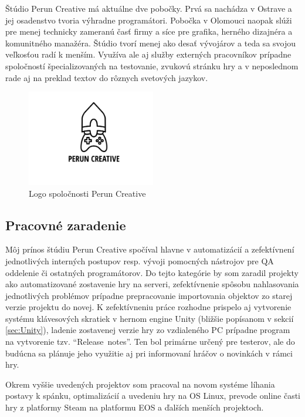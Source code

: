 \documentclass[slovak,bachelorpractice,dept460,male,csharp,cpdeclaration]{diploma}
\begin{document}
Štúdio Perun Creative má aktuálne dve pobočky. Prvá sa nachádza v Ostrave a jej osadenstvo tvoria výhradne programátori. Pobočka v Olomouci naopak slúži pre menej technicky zameranú časť firmy a síce pre grafika, herného dizajnéra a komunitného manažéra. Štúdio tvorí menej ako desať vývojárov a teda sa svojou veľkosťou radí k menším. Využíva ale aj služby externých pracovníkov prípadne spoločností špecializovaných na testovanie, zvukovú stránku hry a v neposlednom rade aj na preklad textov do rôznych svetových jazykov.
\vspace{-20pt}
\begin{figure}[!htbp]
	\centering
	\includegraphics[width=0.5\textwidth]{Pictures/perunLogo.pdf}
	\vspace{-35pt}
	\caption{Logo spoločnosti Perun Creative}
	\label{pic:perunLogo}
\end{figure}
\vspace{-20pt}
\subsection{Pracovné zaradenie}
\label{sec:Me}
Môj prínos štúdiu Perun Creative spočíval hlavne v automatizácií a zefektívnení jednotlivých interných postupov resp. vývoji pomocných nástrojov pre QA oddelenie či ostatných programátorov. Do tejto kategórie by som zaradil projekty ako automatizované zostavenie hry na serveri, zefektívnenie spôsobu nahlasovania jednotlivých problémov prípadne prepracovanie importovania objektov zo starej verzie projektu do novej. K zefektívneniu práce rozhodne prispelo aj vytvorenie systému klávesových skratiek v hernom engine Unity (bližšie popísanom v sekcií \ref{sec:Unity}), ladenie zostavenej verzie hry zo vzdialeného PC prípadne program na vytvorenie tzv. \mbox{\enquote{Release notes}}. Ten bol primárne určený pre testerov, ale do budúcna sa plánuje jeho využitie aj pri informovaní hráčov o novinkách v rámci hry.

Okrem vyššie uvedených projektov som pracoval na novom systéme líhania postavy k spánku, optimalizácií a uvedeniu hry na OS Linux, prevode online časti hry z platformy Steam na platformu EOS a ďalších menších projektoch.
\end{document}
